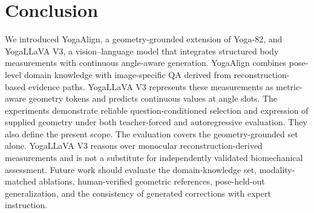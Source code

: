 \section{Conclusion}
\label{sec:conclusion}

We introduced YogaAlign, a geometry-grounded extension of Yoga-82, and YogaLLaVA V3, a vision--language model that integrates structured body measurements with continuous angle-aware generation.
YogaAlign combines pose-level domain knowledge with image-specific QA derived from reconstruction-based evidence paths.
YogaLLaVA V3 represents these measurements as metric-aware geometry tokens and predicts continuous values at angle slots.
The experiments demonstrate reliable question-conditioned selection and expression of supplied geometry under both teacher-forced and autoregressive evaluation.
They also define the present scope.
The evaluation covers the geometry-grounded set alone.
YogaLLaVA V3 reasons over monocular reconstruction-derived measurements and is not a substitute for independently validated biomechanical assessment.
Future work should evaluate the domain-knowledge set, modality-matched ablations, human-verified geometric references, pose-held-out generalization, and the consistency of generated corrections with expert instruction.
